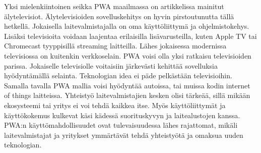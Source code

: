 \documentclass{tktltiki}
\begin{document}
Yksi mielenkiintoinen seikka PWA maailmassa on artikkelissa \cite{8287006} mainitut älytelevisiot. Älytelevisioiden sovelluskehitys on hyvin pirstoutunutta tällä hetkellä. Jokaisella laitevalmistajalla on oma käyttöliittymä ja ohjelmistokehys. Lisäksi televisioita voidaan laajentaa erilaisilla lisävarusteilla, kuten Apple TV tai Chromecast tyyppisillä streaming laitteilla. Lähes jokaisessa modernissa televisiossa on kuitenkin verkkoselain. PWA voisi olla yksi ratkaisu televisioiden parissa. Jokaiselle televisiolle voitaisiin järkevästi kehittää sovelluksia hyödyntämällä selainta. Teknologian idea ei päde pelkästään televisioihin. Samalla tavalla PWA mallia voisi hyödyntää autoissa, tai muissa kodin internet of things laitteissa. Yhteistyö laitevalmistajien kesken olisi tärkeää, sillä mikään ekosysteemi tai yritys ei voi tehdä kaikkea itse. Myös käyttöliittymät ja käyttökokemus kulkevat käsi kädessä suorituskyvyn ja laitealustojen kanssa. PWA:n käyttömahdollisuudet ovat tulevaisuudessa lähes rajattomat, mikäli laitevalmistajat ja yritykset ymmärtävät tehdä yhteistyötä ja omaksua uuden teknologian. 

%
%


%

\clearpage


\lastpage

\appendices
\end{document}
